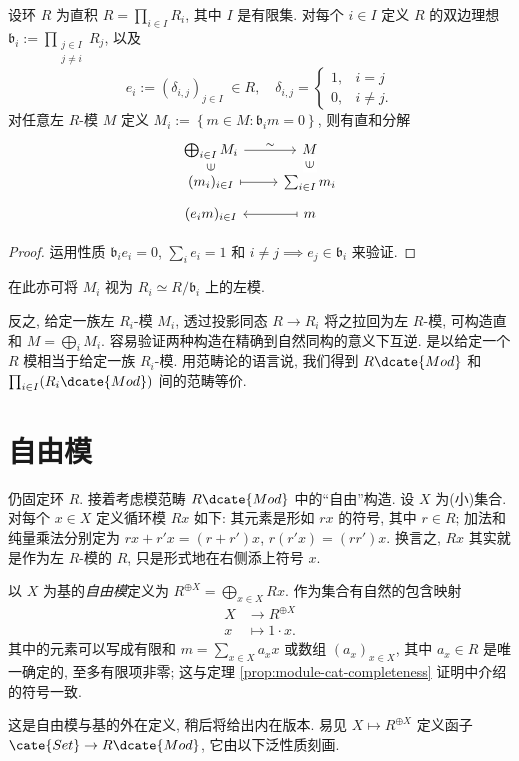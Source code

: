 \begin{lemma}\label{prop:prod-module}
	设环 $R$ 为直积 $R = \prod_{i \in I} R_i$, 其中 $I$ 是有限集. 对每个 $i \in I$ 定义 $R$ 的双边理想 $\mathfrak{b}_i := \prod_{\substack{j \in I \\ j \neq i}} R_j$, 以及
	\[ e_i := (\delta_{i,j})_{j \in I} \; \in R, \quad \delta_{i,j} = \begin{cases} 1, & i=j \\ 0, & i \neq j. \end{cases} \]
	对任意左 $R$-模 $M$ 定义 $M_i := \left\{ m \in M : \mathfrak{b}_i m = 0 \right\}$, 则有直和分解
	\begin{equation*}\begin{tikzcd}[row sep=tiny]
		\bigoplus_{i \in I} M_i \arrow[r, "\sim"] & M \\
		(m_i)_{i \in I} \arrow[mapsto, r] \arrow[phantom, u, "\in" description, sloped] & \sum_{i \in I} m_i \arrow[phantom, u, "\in" description, sloped] \\
		(e_i m)_{i \in I} & m \arrow[mapsto, l]
	\end{tikzcd}\end{equation*}
\end{lemma}
\begin{proof}
	运用性质 $\mathfrak{b}_i e_i = 0$, $\sum_i e_i = 1$ 和 $i \neq j \implies e_j \in \mathfrak{b}_i$ 来验证.
\end{proof}
在此亦可将 $M_i$ 视为 $R_i \simeq R/\mathfrak{b}_i$ 上的左模.
\begin{remark}
	反之, 给定一族左 $R_i$-模 $M_i$, 透过投影同态 $R \to R_i$ 将之拉回为左 $R$-模, 可构造直和 $M = \bigoplus_i M_i$. 容易验证两种构造在精确到自然同构的意义下互逆. 是以给定一个 $R$ 模相当于给定一族 $R_i$-模. 用范畴论的语言说, 我们得到 $R\dcate{Mod}$ 和 $\prod_{i \in I} (R_i\dcate{Mod})$ 间的范畴等价.
\end{remark}


\section{自由模}\label{sec:free-modules}
仍固定环 $R$. 接着考虑模范畴 $R\dcate{Mod}$ 中的``自由''构造. 设 $X$ 为(小)集合. 对每个 $x \in X$ 定义循环模 $Rx$ 如下: 其元素是形如 $rx$ 的符号, 其中 $r \in R$; 加法和纯量乘法分别定为 $rx + r'x = (r+r')x$, $r(r'x) = (rr')x$. 换言之, $Rx$ 其实就是作为左 $R$-模的 $R$, 只是形式地在右侧添上符号 $x$.
\begin{definition}\label{def:free-module}
	以 $X$ 为基的\emph{自由模}定义为 $R^{\oplus X} = \bigoplus_{x \in X} Rx$. 作为集合有自然的包含映射
	\begin{align*}
		X & \longrightarrow R^{\oplus X} \\
		x & \longmapsto 1 \cdot x.
	\end{align*}
	其中的元素可以写成有限和 $m = \sum_{x \in X} a_x x$ 或数组 $(a_x)_{x \in X}$, 其中 $a_x \in R$ 是唯一确定的, 至多有限项非零; 这与定理 \ref{prop:module-cat-completeness} 证明中介绍的符号一致.
\end{definition}
这是自由模与基的外在定义, 稍后将给出内在版本. 易见 $X \mapsto R^{\oplus X}$ 定义函子 $\cate{Set} \to R\dcate{Mod}$, 它由以下泛性质刻画.

